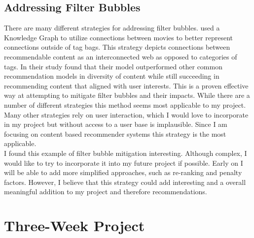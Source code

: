 \documentclass[10pt,twocolumn]{article}
\begin{document}
\subsection{Addressing Filter Bubbles}
There are many different strategies for addressing filter bubbles. \textcite{KidwaiFB} used a Knowledge Graph to utilize connections between movies to better represent connections outside of tag bags. This strategy depicts connections between recommendable content as an interconnected web as opposed to categories of tags. In their study \textcite{KidwaiFB} found that their model outperformed other common recommendation models in diversity of content while still succeeding in recommending content that aligned with user interests. This is a proven effective way at attempting to mitigate filter bubbles and their impacts. While there are a number of different strategies this method seems most applicable to my project. Many other strategies rely on user interaction, which I would love to incorporate in my project but without access to a user base is implausible. Since I am focusing on content based recommender systems this strategy is the most applicable.\\

\indent I found this example of filter bubble mitigation interesting. Although complex, I would like to try to incorporate it into my future project if possible. Early on I will be able to add more simplified approaches, such as re-ranking and penalty factors. However, I believe that this strategy could add interesting and a overall meaningful addition to my project and therefore recommendations. 

\section{Three-Week Project}
\end{document}
